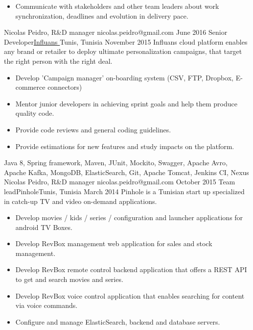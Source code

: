 \begin{experiences}
{\begin{itemize}
        \item Communicate with stakeholders and other team leaders about work synchronization, deadlines and evolution in delivery pace.
      \end{itemize}
    }
    {Nicolas Peidro, R\&D manager} {nicolas.peidro@gmail.com}
  \emptySeparator   
  \experienceWithReference
    {June 2016}       {Senior Developer}{\href{https://www.influans.com}{Influans \faExternalLink}}{Tunis, Tunisia}
    {November 2015}      {Influans cloud platform enables any brand or retailer to deploy ultimate personalization campaigns, that target the right person with the right deal.}
    {
      \begin{itemize}
        \item Develop 'Campaign manager' on-boarding system (CSV, FTP, Dropbox, E-commerce connectors)
        \item Mentor junior developers in achieving sprint goals and help them produce quality code.
        \item Provide code reviews and general coding guidelines.
        \item Provide estimations for new features and study impacts on the platform.
      \end{itemize}
    }
    {Java 8, Spring framework, Maven, JUnit, Mockito, Swagger, Apache Avro, Apache Kafka, MongoDB, ElasticSearch, Git, Apache Tomcat, Jenkins CI, Nexus}
    {Nicolas Peidro, R\&D manager} {nicolas.peidro@gmail.com}
  \emptySeparator  
  \experience
    {October 2015}   {Team lead}{Pinhole}{Tunis, Tunisia}
    {March 2014} {Pinhole is a Tunisian start up specialized in catch-up TV and video on-demand applications.}
                    {
                      \begin{itemize}
                        \item Develop movies / kids / series / configuration and launcher applications for android TV Boxes.
                        \item Develop RevBox management web application for sales and stock management.
                        \item Develop RevBox remote control backend application that offers a REST API to get and search movies and series.
                        \item Develop RevBox voice control application that enables searching for content via voice commands.
                        \item Configure and manage ElasticSearch, backend and database servers.

\end{itemize}}
\end{experiences}
